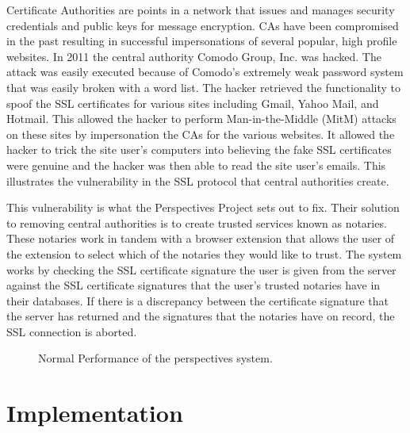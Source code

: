 \documentclass[preprint,review,12pt]{elsarticle}
\begin{document}
Certificate Authorities are points in a network that issues and manages
security credentials and public keys for message encryption. CAs have been
compromised in the past resulting in successful impersonations of several
popular, high profile websites.  In 2011 the central authority Comodo Group,
Inc. was hacked. The attack was easily executed because of Comodo's extremely
weak password system that was easily broken with a word list. The hacker retrieved
the functionality to spoof the SSL certificates for various sites including Gmail, Yahoo Mail, and
Hotmail.  \citep{comodohack} This allowed the hacker to perform
Man-in-the-Middle (MitM) attacks on these sites by impersonation the CAs for
the various websites. It allowed the hacker to trick the site user's computers
into believing the fake SSL certificates were genuine and the hacker was then
able to read the site user's emails.  This illustrates the vulnerability in the
SSL protocol that central authorities create.

This vulnerability is what the Perspectives Project sets out to fix. Their
solution to removing central authorities is to create trusted services known as
notaries. These notaries work in tandem with a browser extension that allows
the user of the extension to select which of the notaries they would like to
trust. The system works by checking the SSL certificate signature the user is
given from the server against the SSL certificate signatures that the user's
trusted notaries have in their databases. If there is a discrepancy between the
certificate signature that the server has returned and the signatures that the
notaries have on record, the SSL connection is aborted.

\begin{figure}[h]
\caption{Normal Performance of the perspectives system.}
\end{figure}

\section{Implementation}
\label{implementation}
\end{document}
